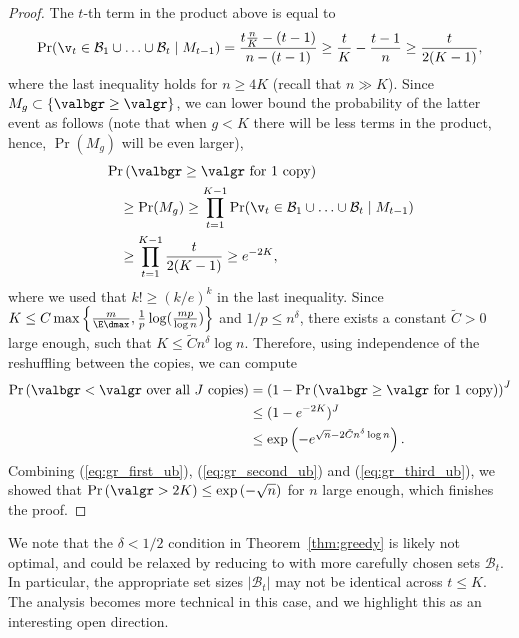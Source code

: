 \begin{proof}
The \(t\)-th term in the product above is equal to  \begin{equation*}
    \Pr(\v_t \in \mathcal{B}_1 \cup \ldots \cup \mathcal{B}_t \mid M_{t - 1}) =  \frac{t \frac{n}{K} - (t - 1)}{n - (t - 1)} \geq \frac{t}{K} - \frac{t - 1}{n} \geq \frac{t}{2(K - 1)},
\end{equation*}
where the last inequality holds for \(n \geq 4K\) (recall that \(n \gg K\)). Since \(M_g \subset \{\valbgr \geq \valgr\}\), we can lower bound the probability of the latter event as follows (note that when \(g < K\) there will be less terms in the product, hence, \(\Pr(M_g)\) will be even larger),
\begin{equation*}
\begin{aligned}
&\Pr\left(\valbgr \geq  \valgr \text{ for } 1 \text{ copy}\right) \\
&\quad \geq \Pr(M_g) \geq \prod_{t=1}^{K - 1} \Pr(\v_t \in \mathcal{B}_1 \cup \ldots \cup \mathcal{B}_t \mid M_{t - 1})  \\
&\quad \geq \prod_{t=1}^{K - 1} \frac{t}{2(K - 1)} \geq e^{-2K},
\end{aligned}
\end{equation*}
where we used that \(k! \geq (k/e)^k\) in the last inequality.
Since \(K \leq C \max\left\{ \frac{m}{\E \dmax}, \frac{1}{p} \log(\frac{mp}{\log{n}}) \right\}\) and \(1/p \leq n^{\delta}\), there exists a constant \(\tilde C > 0\) large enough, such that \(K  \leq \tilde C n^{\delta} \log n\). Therefore, using independence of the reshuffling between the copies, we can compute
\begin{equation}
\label{eq:gr_third_ub}
\begin{aligned}
\Pr\left(\valbgr < \valgr \text{ over all $J$ copies}   \right)& = \left( 1 - \Pr\left(\valbgr \geq  \valgr \text{ for } 1 \text{ copy} \right) \right)^J \\
& \leq (1 - e^{-2K})^J \\
& \leq \exp\left(- e^{\sqrt{n}- 2\tilde C n^{\delta} \log{n}} \right).
\end{aligned}
\end{equation}
%
Combining (\ref{eq:gr_first_ub}), (\ref{eq:gr_second_ub}) and (\ref{eq:gr_third_ub}), we showed that $\Pr\left(\valgr > 2K \right) \leq \exp\left(-\sqrt{n}\right)$ for \(n\) large enough, which finishes the proof.  
\end{proof}

\begin{remark}
We note that the $\delta < 1/2$ condition in Theorem~\ref{thm:greedy} is likely not optimal, and could be relaxed by reducing to \bgreedy with more carefully chosen sets $\mathcal{B}_t$. In particular, the appropriate set sizes $|\mathcal{B}_t|$ may not be identical across $t \leq K$. The analysis becomes more technical in this case, and we highlight this as an interesting open direction.
\end{remark}

